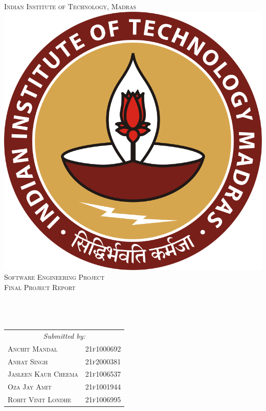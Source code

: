 
\begin{titlepage}   
   \begin{center}        
        \textsc{\LARGE Indian Institute of Technology, Madras}\\[1.5cm]
        \includegraphics[scale=.2]{img/iitm_logo.png}\\[1cm]
        \textsc{\Large Software Engineering Project}\\[0.5cm]
        \textsc{\large Final Project Report}\\[0.5cm]

        \vspace{3em}
        \HRule \\[0.4cm]
        { \huge \doctitle}\\[0.4cm]
        \HRule \\[1.5cm]

        \begin{table}[!h]
            \centering
            \begin{tabular}{ll}
            \multicolumn{2}{c}{\Large \emph{Submitted by:}} \\[2ex]
            \textsc{Anchit Mandal} & \textsc{21f1000692} \\
            \textsc{Anhat Singh} & \textsc{21f2000381} \\
            \textsc{Jasleen Kaur Cheema} & \textsc{21f1006537} \\
            \textsc{Oza Jay Amit} & \textsc{21f1001944} \\
            \textsc{Rohit Vinit Londhe} & \textsc{21f1006995}
            \end{tabular}            
        \end{table}
        \vspace{3cm}
        

\end{center}
\end{titlepage}
